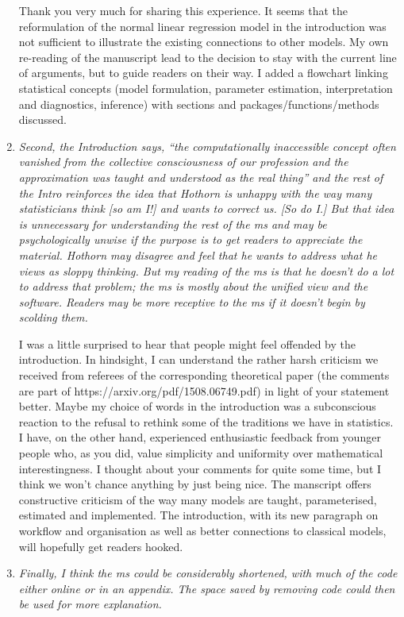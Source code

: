 \documentclass[12pt]{article}
\begin{document}
\begin{enumerate}
Thank you very much for sharing this experience. It seems that the
reformulation of the normal linear regression model in the introduction was
not sufficient to illustrate the existing connections to other models. My
own re-reading of the manuscript lead to the decision to stay with the
current line of arguments, but to guide readers on their way. I added a
flowchart linking statistical concepts (model formulation, parameter
estimation, interpretation and diagnostics, inference) with sections and
packages/functions/methods discussed.

\item \textit{Second, the Introduction says, “the computationally inaccessible concept
often vanished from the collective consciousness of our profession and the
approximation was taught and understood as the real thing” and the rest of
the Intro reinforces the idea that Hothorn is unhappy with the way many
statisticians think [so am I!] and wants to correct us.  [So do I.]  But
that idea is unnecessary for understanding the rest of the ms and may be
psychologically unwise if the purpose is to get readers to appreciate the
material.  Hothorn may disagree and feel that he wants to address what he
views as sloppy thinking.  But my reading of the ms is that he doesn’t do a
lot to address that problem; the ms is mostly about the unified view and the
software. Readers may be more receptive to the ms if it doesn’t begin by
scolding them. }

I was a little surprised to hear that people might feel
offended by the introduction. In hindsight, I can understand the rather
harsh criticism we received from referees of the corresponding theoretical
paper (the comments are part of https://arxiv.org/pdf/1508.06749.pdf)
in light of your statement better. Maybe my choice of words in the
introduction was a subconscious reaction to the refusal to rethink some of
the traditions we have in statistics. I have, on the other hand, experienced
enthusiastic feedback from younger people who, as you did, value simplicity
and uniformity over mathematical interestingness. I thought about your
comments for quite some time, but I think we won't chance anything by just
being nice. The manscript offers constructive criticism of the way many
models are taught, parameterised, estimated and implemented. The
introduction, with its new paragraph on workflow and organisation as well as
better connections to classical models, will hopefully get readers
hooked.

\item \textit{Finally, I think the ms could be considerably shortened,
with much of the code either online or in an appendix.  The space saved by
removing code could then be used for more explanation.  }


\end{enumerate}
\end{document}
